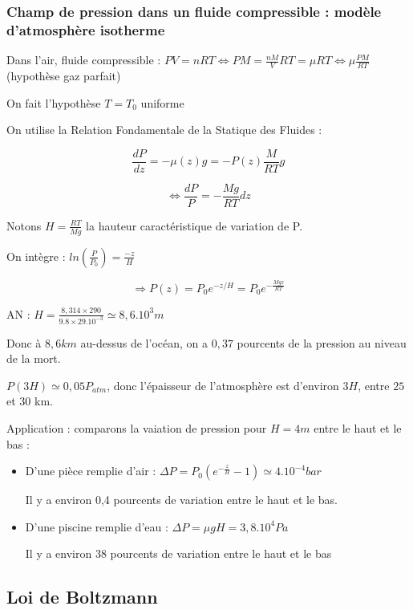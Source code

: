 \documentclass[a4paper,12pt]{book}
\begin{document}
\subsubsection{Champ de pression dans un fluide compressible : modèle d'atmosphère isotherme}
Dans l'air, fluide compressible : $PV=nRT \Leftrightarrow PM = \frac{nM}{V}RT=\mu RT \Leftrightarrow \mu \frac{PM}{RT}$ (hypothèse gaz parfait)
\par On fait l'hypothèse $T=T_0$ uniforme
\par On utilise la Relation Fondamentale de la Statique des Fluides :
\par $$ \frac{dP}{dz} =-\mu(z) g=-P(z)\frac{M}{RT}g$$
\par $$ \Leftrightarrow \frac{dP}{P}=-\frac{Mg}{RT}dz$$
\par Notons $H=\frac{RT}{Mg}$ la hauteur caractéristique de variation de P.
\par On intègre : $ln\left(\frac{P}{P_0}\right)=\frac{-z}{H}$
\par $$\Rightarrow P(z) = P_0e^{-z/H}=P_0e^{-\frac{Mgz}{RT}}$$
\par AN : $H=\frac{8,314\times 290}{9.8\times  29.10^{-3}}\simeq 8,6.10^3m$
\par Donc à $8,6km$ au-dessus de l'océan, on a $0,37$ pourcents de la pression au niveau de la mort.
\par $P(3H) \simeq 0,05 P_{atm}$, donc l'épaisseur de l'atmosphère est d'environ $3H$, entre $25$ et $30$ km.
\par Application : comparons la vaiation de pression pour $H=4m$ entre le haut et le bas :\begin{itemize}
    \item D'une pièce remplie d'air : $\Delta P = P_0(e^{-\frac{z}{H}}-1)\simeq 4.10^{-4} bar$
    \par Il y a environ 0,4 pourcents de variation entre le haut et le bas. 
    \item D'une piscine remplie d'eau : $\Delta P = \mu gH = 3,8.10^4 Pa$
    \par Il y a environ 38 pourcents de variation entre le haut et le bas
\end{itemize}

\subsection{Loi de Boltzmann}
\end{document}
